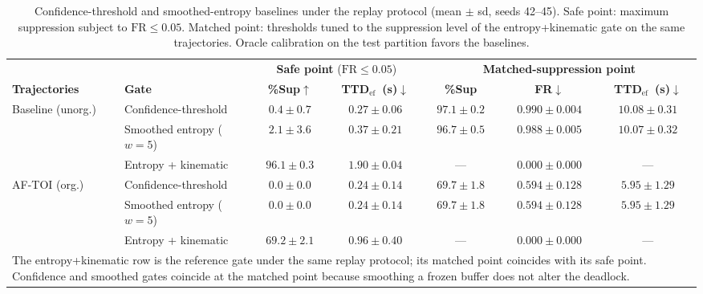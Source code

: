 \documentclass[a4paper,fleqn]{cas-dc}
\begin{document}
{\begin{table}[!tbp]
\color{\revcolor}
\centering
\caption{Confidence-threshold and smoothed-entropy baselines under the replay
protocol (mean $\pm$ sd, seeds 42--45). Safe point: maximum suppression
subject to $\mathrm{FR}\le0.05$. Matched point: thresholds tuned to the
suppression level of the entropy+kinematic gate on the same trajectories.
Oracle calibration on the test partition favors the baselines.}
\label{tab:gating_baselines}
\footnotesize
\setlength{\tabcolsep}{5pt}
\renewcommand{\arraystretch}{1.2}
\begin{tabular}{l l c c c c c}
\toprule
& & \multicolumn{2}{c}{\textbf{Safe point} ($\mathrm{FR}\le0.05$)}
  & \multicolumn{3}{c}{\textbf{Matched-suppression point}} \\
\cmidrule(lr){3-4}\cmidrule(lr){5-7}
\textbf{Trajectories} & \textbf{Gate}
  & \textbf{\%Sup}$\uparrow$ & \textbf{TTD$_{\mathrm{ef}}$~(s)}$\downarrow$
  & \textbf{\%Sup} & \textbf{FR}$\downarrow$ & \textbf{TTD$_{\mathrm{ef}}$~(s)}$\downarrow$ \\
\midrule
\multirow{3}{*}{Baseline (unorg.)}
 & Confidence-threshold        & $0.4 \pm 0.7$  & $0.27 \pm 0.06$ & $97.1 \pm 0.2$ & $0.990 \pm 0.004$ & $10.08 \pm 0.31$ \\
 & Smoothed entropy ($w{=}5$)  & $2.1 \pm 3.6$  & $0.37 \pm 0.21$ & $96.7 \pm 0.5$ & $0.988 \pm 0.005$ & $10.07 \pm 0.32$ \\
 & Entropy + kinematic         & $\mathbf{96.1 \pm 0.3}$ & $1.90 \pm 0.04$ & --- & $\mathbf{0.000 \pm 0.000}$ & --- \\
\midrule
\multirow{3}{*}{\mbox{AF-TOI} (org.)}
 & Confidence-threshold        & $0.0 \pm 0.0$  & $0.24 \pm 0.14$ & $69.7 \pm 1.8$ & $0.594 \pm 0.128$ & $5.95 \pm 1.29$ \\
 & Smoothed entropy ($w{=}5$)  & $0.0 \pm 0.0$  & $0.24 \pm 0.14$ & $69.7 \pm 1.8$ & $0.594 \pm 0.128$ & $5.95 \pm 1.29$ \\
 & Entropy + kinematic         & $\mathbf{69.2 \pm 2.1}$ & $\mathbf{0.96 \pm 0.40}$ & --- & $\mathbf{0.000 \pm 0.000}$ & --- \\
\bottomrule
\multicolumn{7}{p{0.93\textwidth}}{\footnotesize The entropy+kinematic row is
the reference gate under the same replay protocol; its matched point coincides
with its safe point. Confidence and smoothed gates coincide at the matched
point because smoothing a frozen buffer does not alter the deadlock.}
\end{tabular}
\end{table}
}
\end{document}

